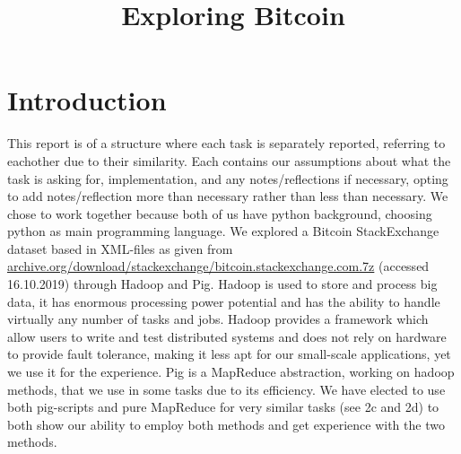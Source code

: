 \documentclass[fleqn,10pt]{wlscirep}
\title{Exploring Bitcoin }
\author{}
\begin{document}





\flushbottom
\maketitle

\tableofcontents
\newpage
\section{Introduction}
This report is of a structure where each task is separately reported, referring to eachother due to their similarity. Each contains our assumptions about what the task is asking for, implementation, and any notes/reflections if necessary, opting to add notes/reflection more than necessary rather than less than necessary.
We chose to work together because both of us have python background, choosing python as main programming language. We explored a Bitcoin StackExchange dataset based in XML-files as given from \url{archive.org/download/stackexchange/bitcoin.stackexchange.com.7z} (accessed 16.10.2019) through Hadoop and Pig. 
Hadoop is used to store and process big data, it has enormous processing power potential and has the ability to handle virtually any number of tasks and jobs. Hadoop provides a framework which allow users to write and test distributed systems and does not rely on hardware to provide fault tolerance, making it less apt for our small-scale applications, yet we use it for the experience. Pig is a MapReduce abstraction, working on hadoop methods, that we use in some tasks due to its efficiency. We have elected to use both pig-scripts and pure MapReduce for very similar tasks (see 2c and 2d) to both show our ability to employ both methods and get experience with the two methods.
\end{document}
